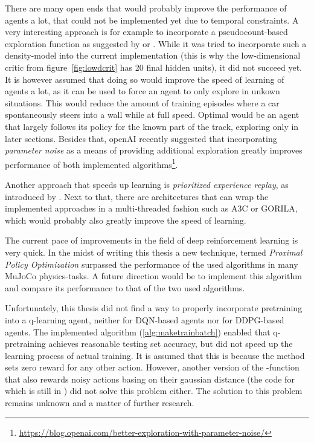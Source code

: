 There are many open ends that would probably improve the performance of agents a lot, that could not be implemented yet due to temporal constraints. A very interesting approach is for example to incorporate a pseudocount-based exploration function as suggested by \cite{ostrovski_count-based_2017} or \cite{martin_count-based_2017}. While it was tried to incorporate such a density-model into the current implementation (this is why the low-dimensional critic from figure~\ref{fig:lowdcrit} has 20 final hidden units), it did not succeed yet. It is however assumed that doing so would improve the speed of learning of agents a lot, as it can be used to force an agent to only explore in unkown situations. This would reduce the amount of training episodes where a car spontaneously steers into a wall while at full speed. Optimal would be an agent that largely follows its policy for the known part of the track, exploring only in later sections. Besides that, openAI recently suggested that incorporating \textit{parameter noise} as a means of providing additional exploration greatly improves performance of both implemented algorithms\footnote{\url{https://blog.openai.com/better-exploration-with-parameter-noise/}}.

Another approach that speeds up learning is \textit{prioritized experience replay}, as introduced by \cite{schaul_prioritized_2015}. Next to that, there are architectures that can wrap the implemented approaches in a multi-threaded fashion such as  A3C\cite{mnih_asynchronous_2016} or GORILA\cite{nair_massively_2015}, which would probably also greatly improve the speed of learning.

The current pace of improvements in the field of deep reinforcement learning is very quick. In the midst of writing this thesis a new technique, termed \textit{Proximal Policy Optimization} \cite{schulman_proximal_2017} surpassed the performance of the used algorithms in many MuJoCo physics-tasks. A future direction would be to implement this algorithm and compare its performance to that of the two used algorithms.

Unfortunately, this thesis did not find a way to properly incorporate pretraining into a q-learning agent, neither for DQN-based agents nor for DDPG-based agents. The implemented algorithm (\ref{alg:maketrainbatch}) enabled that q-pretraining achieves reasonable testing set accuracy, but did not speed up the learning process of actual training. It is assumed that this is because the method sets zero reward for any other action. However, another version of the -function that also rewards noisy actions basing on their gaussian distance (the code for which is still in ) did not solve this problem either. The solution to this problem remains unknown and a matter of further research.

